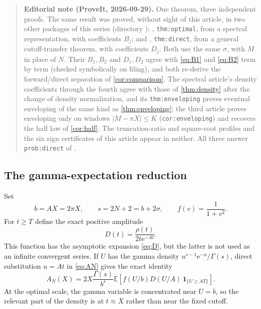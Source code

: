 \documentclass[11pt,a4paper]{article}
\theoremstyle{definition}
\numberwithin{equation}{section}
\newcommand{\ee}{\mathrm{e}}
\newcommand{\E}{\mathbb E}
\begin{document}
\begin{quote}\small\textbf{Editorial note (ProveIt, 2026-09-29).} One theorem, three independent proofs. The same result was proved, without sight of this article, in two other packages of this series (directory ): , \texttt{thm:optimal}, from a spectral representation, with coefficients $B_j$; and , \texttt{thm:direct}, from a general cutoff-transfer theorem, with coefficients $D_j$. Both use the same $\sigma$, with $M$ in place of $N$. Their $B_1,B_2$ and $D_1,D_2$ agree with \eqref{eq:B1} and \eqref{eq:B2} term by term (checked symbolically on filing), and both re-derive the forward/direct separation of \cref{cor:comparison}. The spectral article's density coefficients through the fourth agree with those of \cref{thm:density} after the change of density normalization, and its \texttt{thm:enveloping} proves eventual enveloping of the same kind as \cref{thm:enveloping}; the third article proves enveloping only on windows $|M-\pi X|\le K$ (\texttt{cor:enveloping}) and recovers the half law of \cref{cor:half}. The truncation-ratio and square-root profiles and the six sign certificates of this article appear in neither. All three answer \texttt{prob:direct} of .\end{quote}

\subsection{The gamma-expectation reduction}
Set
\begin{equation}
 b=AX=2\pi X,\qquad s=2N+2=b+2\sigma,
 \qquad f(v)=\frac1{1+v^2}.
 \label{eq:gamma-parameters}
\end{equation}
For $t\ge T$ define the exact positive amplitude
\begin{equation}
 D(t)=\frac{\rho(t)}{2t\ee^{-At}}.
 \label{eq:exactD}
\end{equation}
This function has the asymptotic expansion \eqref{eq:D}, but the latter
is not used as an infinite convergent series. If $U$ has the gamma density
$u^{s-1}\ee^{-u}/\Gamma(s)$, direct substitution $u=At$ in
\eqref{eq:AN} gives the exact identity
\begin{equation}
 A_N(X)=2X\frac{\Gamma(s)}{b^s}
 \E\left[f(U/b)D(U/A)\,\mathbf1_{\{U\ge AT\}}\right].
 \label{eq:gammaexact}
\end{equation}
At the optimal scale, the gamma variable is concentrated near $U=b$,
so the relevant part of the density is at $t\approx X$ rather than near
the fixed cutoff.
\end{document}
